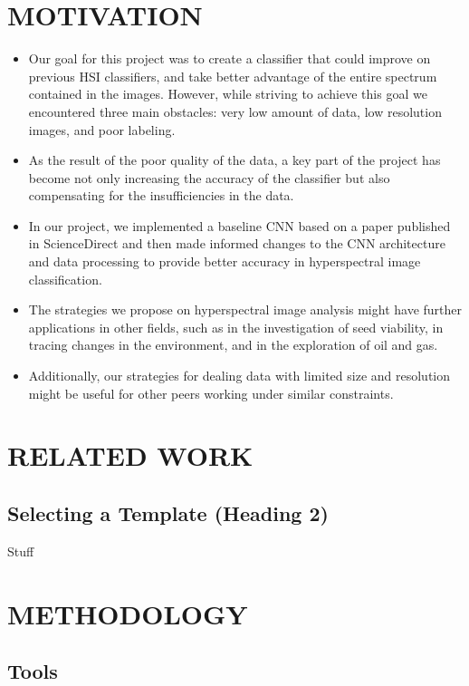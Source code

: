 \documentclass[letterpaper, 10 pt, conference]{ieeeconf}  %
\begin{document}
\section{MOTIVATION}
\begin{itemize}
\item Our goal for this project was to create a classifier that could improve on previous HSI classifiers, and take better advantage of the entire spectrum contained in the images. However, while striving to achieve this goal we encountered three main obstacles: very low amount of data, low resolution images, and poor labeling.

\item As the result of the poor quality of the data, a key part of the project has become not only increasing the accuracy of the classifier but also compensating for the insufficiencies in the data. 

\item In our project, we implemented a baseline CNN based on a paper published in ScienceDirect and then made informed changes to the CNN architecture and data processing to provide better accuracy in hyperspectral image classification. 

\item The strategies we propose on hyperspectral image analysis might have further applications in other fields, such as in the investigation of seed viability, in tracing changes in the environment, and in the exploration of oil and gas. 

\item Additionally, our strategies for dealing data with limited size and resolution might be useful for other peers working under similar constraints. 
\end{itemize}

\section{RELATED WORK}

\subsection{Selecting a Template (Heading 2)}

Stuff

\section{METHODOLOGY}

\subsection{Tools}
\end{document}
